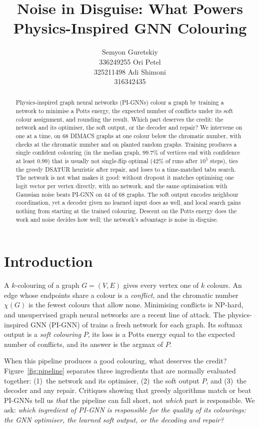 \documentclass[11pt]{article}
\title{Noise in Disguise: What Powers\\
       Physics-Inspired GNN Colouring}
\author{Semyon Guretskiy \\ 336249255 \And
        Ori Petel \\ 325211498 \And
        Adi Shimoni \\ 316342435}
\begin{document}
\maketitle

\begin{abstract}
Physics-inspired graph neural networks (PI-GNNs) colour a graph by training a
network to minimise a Potts energy, the expected number of conflicts under its
soft colour assignment, and rounding the result. Which part deserves the
credit: the network and its optimiser, the soft output, or the decoder and
repair? We intervene on one at a time, on 68 DIMACS graphs at one colour
below the chromatic number, with checks at the chromatic number and on
planted random graphs. Training produces a single confident
colouring (in the median graph, $99.7\%$ of vertices end with confidence at
least $0.99$) that is usually not single-flip optimal ($42\%$ of runs after
$10^5$ steps), ties the greedy DSATUR heuristic after repair, and loses to a
time-matched tabu search. The network is not what makes it good: without
dropout it matches optimising one logit vector per vertex directly, with no
network, and the same optimisation with Gaussian noise beats PI-GNN on $44$
of $68$ graphs. The soft output encodes neighbour coordination, yet a decoder
given no learned input does as well, and local search gains nothing from
starting at the trained colouring. Descent on the Potts energy does the work
and noise decides how well; the network's advantage is noise in disguise.
\end{abstract}

\section{Introduction}

A $k$-colouring of a graph $G=(V,E)$ gives every vertex one of $k$ colours. An
edge whose endpoints share a colour is a \emph{conflict}, and the chromatic
number $\chi(G)$ is the fewest colours that allow none. Minimising conflicts is
NP-hard, and unsupervised graph neural networks are a recent line of attack.
The physics-inspired GNN (PI-GNN) of \citet{schuetz2022colouring} trains a
fresh network for each graph. Its softmax output is a \emph{soft colouring}
$P$, its loss is a Potts energy equal to the expected number of conflicts, and
its answer is the argmax of $P$.

When this pipeline produces a good colouring, what deserves the credit?
Figure~\ref{fig:pipeline} separates three ingredients that are normally
evaluated together: (1)~the network and its optimiser, (2)~the soft output
$P$, and (3)~the decoder and any repair.
Critiques showing that greedy algorithms match or beat PI-GNNs
\cite{angelini2023cautionary,boettcher2023inability} tell us \emph{that} the
pipeline can fall short, not \emph{which} part is responsible. We ask:
\emph{which ingredient of PI-GNN is responsible for the quality of its
colourings: the GNN optimiser, the learned soft output, or the decoding and
repair?}
\end{document}
